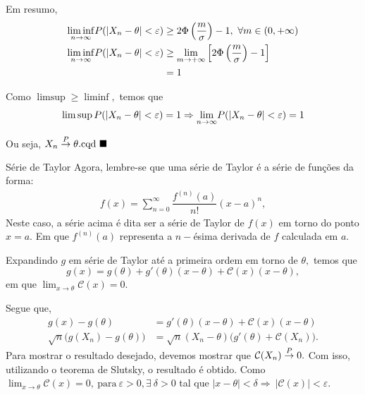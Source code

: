 \documentclass[12pt]{beamer}
\begin{document}
\begin{frame}{}
\begin{block}{}
\justifying
Em resumo,
\begin{align*}
    {\displaystyle \liminf_{n\to\infty}} P(|X_{n}-\theta|<\varepsilon)&\geq 2\Phi\left(\frac{m}{\sigma}\right)-1,~\forall m\in (0,+\infty)\\  
    {\displaystyle \liminf_{n\to\infty}} P(|X_{n}-\theta|<\varepsilon)&\geq \lim_{m\rightarrow +\infty} \Big[2\Phi\left(\frac{m}{\sigma}\right)-1\Big]\\
    &=1
\end{align*}
\end{block}
\pause
\begin{block}{}
\justifying
Como $\limsup\geq \liminf,$ temos que
\begin{align}\label{num1}
    \limsup P(|X_{n}-\theta|<\varepsilon)=1\Rightarrow {\displaystyle \lim_{n\to\infty}} P(|X_{n}-\theta|<\varepsilon)=1
\end{align}
\end{block}
\pause
\begin{block}{}
\justifying
Ou seja, $X_{n}\overset{P}{\rightarrow} \theta. \text{cqd}~\blacksquare$
\end{block}
\end{frame}

\begin{frame}{}
	\begin{block}{Série de Taylor}
		\justifying
		Agora, lembre-se que uma série de Taylor é a série de funções da forma:
		\begin{align*}
			f(x)=\displaystyle{\sum_{n=0}^{\infty}\dfrac{f^{(n)}(a)}{n!}}(x-a)^{n},
		\end{align*}
Neste caso, a série acima é dita ser a série de Taylor de $f(x)$ em torno do ponto $x=a$. Em que $f^{(n)}(a)$ representa a $n-$ésima derivada de $f$ calculada em $a.$
	\end{block}
	\pause
	\begin{block}{}
		\justifying
		Expandindo $g$ em série de Taylor até a primeira ordem em torno de $\theta,$ temos que $$g(x)=g(\theta)+g'(\theta)(x-\theta)+\mathcal{C}(x)(x-\theta),$$ em que ${\displaystyle \lim_{x\rightarrow \theta} \mathcal{C}(x)=0}.$
	\end{block}
\end{frame}

\begin{frame}{}
\begin{block}{}
\justifying
Segue que, 
\begin{align*}
g(x)-g(\theta)&=g'(\theta)(x-\theta)+\mathcal{C}(x)(x-\theta)\\
\sqrt{n}\big(g(X_{n})-g(\theta)\big)&=\sqrt{n}(X_{n}-\theta)\big(g'(\theta)+\mathcal{C}(X_{n})\big).
\end{align*}
Para mostrar o resultado desejado, devemos mostrar que $\mathcal{C}(X_{n})\overset{P}{\rightarrow} 0.$ Com isso, utilizando o teorema de Slutsky, o resultado é obtido. Como ${\displaystyle \lim_{x\rightarrow \theta} \mathcal{C}(x)=0},~\text{para}~\varepsilon>0, \exists~\delta>0$ tal que $|x-\theta|<\delta\Rightarrow~|\mathcal{C}(x)|<\varepsilon.$
\end{block}
\end{frame}
\end{document}
